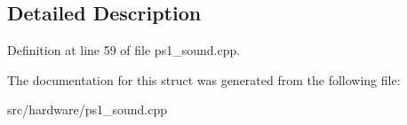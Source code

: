 \subsection{Detailed Description}


Definition at line 59 of file ps1\-\_\-sound.\-cpp.



The documentation for this struct was generated from the following file\-:\begin{DoxyCompactItemize}
\item 
src/hardware/ps1\-\_\-sound.\-cpp\end{DoxyCompactItemize}
